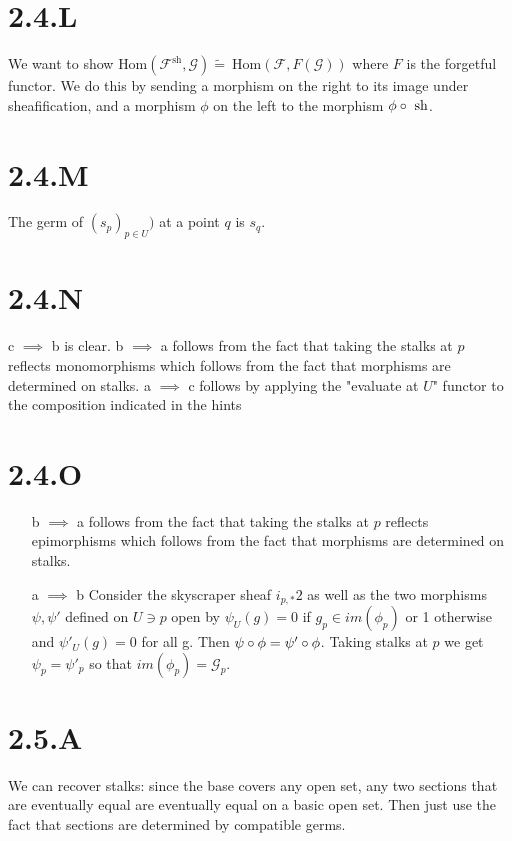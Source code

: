 \documentclass{article}
\begin{document}
\section*{2.4.L}
We want to show $\text{Hom}(\mathscr{F}^\text{sh}, \mathscr{G}) \widetilde{=}\
    \text{Hom}(\mathscr{F}, F(\mathscr{G}))$
where $F$ is the forgetful functor. We do this by sending a morphism on the right to its
image under sheafification, and a morphism $\phi$ on the left to the morphism $\phi \circ \
    \text{sh}$.

\section*{2.4.M}
The germ of $(s_p)_{p \in U})$ at a point $q$ is $s_q$.

\section*{2.4.N}
c $\implies$ b is clear. b $\implies$ a follows from the fact that taking the stalks at $p$
reflects monomorphisms which follows from the fact that morphisms are determined on stalks.
a $\implies$ c follows by applying the "evaluate at $U$" functor to the composition indicated
in the hints

\section*{2.4.O}
\begin{itemize}
    \item[b $\implies$ a] follows from the fact that taking the stalks at $p$
          reflects epimorphisms which follows from the fact that morphisms are determined on stalks.
    \item[a $\implies$ b] Consider the skyscraper sheaf $i_{p,*}2$ as well as the two morphisms
          $\psi, \psi'$ defined on $U \ni p$ open by $\psi_U(g)=0$ if $g_p \in im(\phi_p)$ or 1 otherwise
          and $\psi'_U(g)=0$ for all g. Then $\psi \circ \phi = \psi' \circ \phi$. Taking stalks at $p$
          we get $\psi_p=\psi'_p$ so that $im(\phi_p)=\mathscr{G}_p$.
\end{itemize}

\section*{2.5.A}
We can recover stalks: since the base covers any open set, any two sections that are eventually
equal are eventually equal on a basic open set. Then just use the fact that sections are determined
by compatible germs.
\end{document}
